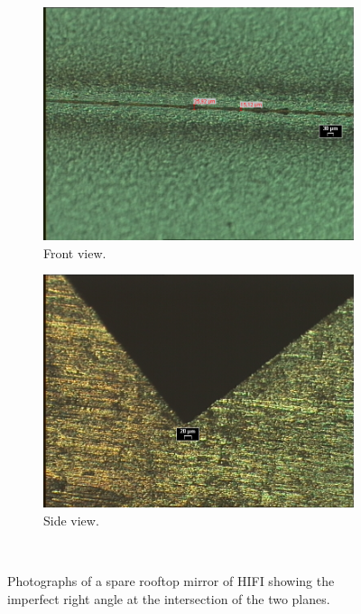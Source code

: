 \begin{figure}[hbtp]
    \centering
    \begin{subfigure}[c]{.5\columnwidth}
        \includegraphics[width=\linewidth]{RT_13_mu_telis_spare_3}
        \caption{Front view.}
    \end{subfigure}%
    \begin{subfigure}[c]{.5\columnwidth}
        \includegraphics[width=\linewidth]{RT_13_mu_telis_spare_zij3}
        \caption{Side view.}
    \end{subfigure}\\
    \caption{
        Photographs of a spare rooftop mirror of HIFI showing
        the imperfect right angle at the intersection of the two planes.
    }
    \label{fig:rooftop_photos}
\end{figure}

